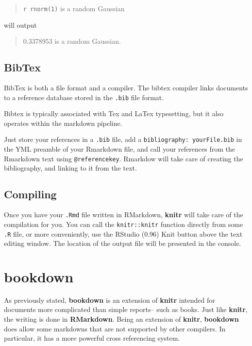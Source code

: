 \documentclass[]{book}
\theoremstyle{definition}
\theoremstyle{definition}
\theoremstyle{definition}
\theoremstyle{remark}
\begin{document}
\begin{quote}
\texttt{\textasciigrave{}r\ rnorm(1)\textasciigrave{}} is a random
Gaussian
\end{quote}

will output

\begin{quote}
0.3378953 is a random Gaussian.
\end{quote}

\subsection{BibTex}\label{bibtex}

BibTex is both a file format and a compiler. The bibtex compiler links
documents to a reference database stored in the \texttt{.bib} file
format.

Bibtex is typically associated with Tex and LaTex typesetting, but it
also operates within the markdown pipeline.

Just store your references in a \texttt{.bib} file, add a
\texttt{bibliography:\ yourFile.bib} in the YML preamble of your
Rmarkdown file, and call your references from the Rmarkdown text using
\texttt{@referencekey}. Rmarkdow will take care of creating the
bibliography, and linking to it from the text.

\subsection{Compiling}\label{compiling}

Once you have your \texttt{.Rmd} file written in RMarkdown,
\textbf{knitr} will take care of the compilation for you. You can call
the \texttt{knitr::knitr} function directly from some \texttt{.R} file,
or more conveniently, use the RStudio (0.96) Knit button above the text
editing window. The location of the output file will be presented in the
console.

\section{bookdown}\label{bookdown}

As previously stated, \textbf{bookdown} is an extension of
\textbf{knitr} intended for documents more complicated than simple
reports-- such as books. Just like \textbf{knitr}, the writing is done
in \textbf{RMarkdown}. Being an extension of \textbf{knitr},
\textbf{bookdown} does allow some markdowns that are not supported by
other compilers. In particular, it has a more powerful cross referencing
system.
\end{document}
